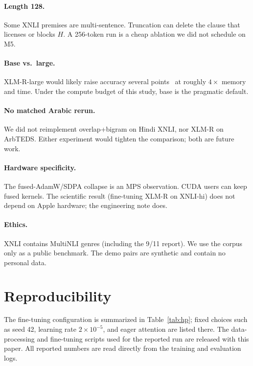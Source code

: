 \documentclass[conference]{IEEEtran}
\begin{document}
\paragraph{Length 128.}
Some XNLI premises are multi-sentence. Truncation can delete the clause that licenses or blocks $H$. A 256-token run is a cheap ablation we did not schedule on M5.

\paragraph{Base vs.\ large.}
XLM-R-large would likely raise accuracy several points~\citep{conneau2020xlmr} at roughly $4\times$ memory and time. Under the compute budget of this study, base is the pragmatic default.

\paragraph{No matched Arabic rerun.}
We did not reimplement overlap+bigram on Hindi XNLI, nor XLM-R on ArbTEDS. Either experiment would tighten the comparison; both are future work.

\paragraph{Hardware specificity.}
The fused-AdamW/SDPA collapse is an MPS observation. CUDA users can keep fused kernels. The scientific result (fine-tuning XLM-R on XNLI-hi) does not depend on Apple hardware; the engineering note does.

\paragraph{Ethics.}
XNLI contains MultiNLI genres (including the 9/11 report). We use the corpus only as a public benchmark. The demo pairs are synthetic and contain no personal data.

\section{Reproducibility}
\label{sec:repro}
The fine-tuning configuration is summarized in Table~\ref{tab:hp}; fixed choices such as seed 42, learning rate $2\times10^{-5}$, and eager attention are listed there. The data-processing and fine-tuning scripts used for the reported run are released with this paper. All reported numbers are read directly from the training and evaluation logs.
\end{document}
